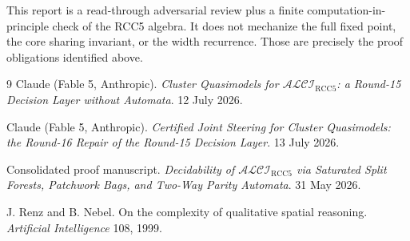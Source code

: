 \documentclass[11pt]{article}
\newcommand{\ALCIRCC}{\ensuremath{\mathcal{ALCI}_{\mathrm{RCC5}}}}
\begin{document}
This report is a read-through adversarial review plus a finite computation-in-principle check of the RCC5 algebra.  It does not mechanize the full fixed point, the core sharing invariant, or the width recurrence.  Those are precisely the proof obligations identified above.

\begin{thebibliography}{9}
Claude (Fable 5, Anthropic).  \emph{Cluster Quasimodels for \ALCIRCC{}: a Round-15 Decision Layer without Automata}.  12 July 2026.

Claude (Fable 5, Anthropic).  \emph{Certified Joint Steering for Cluster Quasimodels: the Round-16 Repair of the Round-15 Decision Layer}.  13 July 2026.

Consolidated proof manuscript.  \emph{Decidability of \ALCIRCC{} via Saturated Split Forests, Patchwork Bags, and Two-Way Parity Automata}.  31 May 2026.

J. Renz and B. Nebel.  On the complexity of qualitative spatial reasoning.  \emph{Artificial Intelligence} 108, 1999.
\end{thebibliography}
\end{document}
